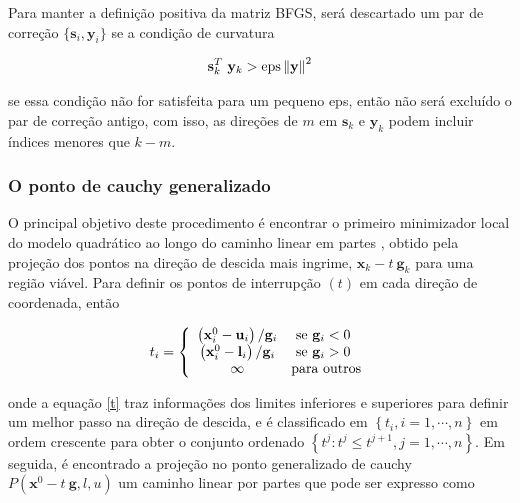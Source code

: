           
          Para manter a definição positiva da matriz BFGS, será descartado um par de correção $\{\mathbf{s}_{i},\mathbf{y}_{i} \}$ se a condição de curvatura 
          
          \begin{eqnarray}
           \nonumber
           \mathbf{s}_{k}^{T}~\mathbf{y}_{k} > \hbox{eps} \left \| \mathbf{y} \right \|^{2}
          \end{eqnarray}
          
          se essa condição não for satisfeita para um pequeno eps, então não será excluído o par de correção antigo, com isso, as direções de $m$ em $\mathbf{s}_{k}$ e $\mathbf{y}_{k}$ podem incluir índices menores que $k-m$.

          \subsubsection{O ponto de cauchy generalizado}

          O principal objetivo deste procedimento é encontrar o primeiro minimizador local do modelo quadrático ao longo do caminho linear em partes \citep{lescrenier_convergence_1991}, obtido pela projeção dos pontos na direção de descida mais ingrime, $\mathbf{x}_{k}-t~\mathbf{g}_{k}$ para uma região viável. Para definir os pontos de interrupção $(t)$ em cada direção de coordenada, então
          
          \begin{eqnarray}
          \label{t}
          t_{i}=\left\{\begin{array}{cl}{\left(\mathbf{x}_{i}^{0}-\mathbf{u}_{i}\right) / \mathbf{g}_{i}} & {\hbox{ se } \mathbf{g}_{i}<0} \\ {\left(\mathbf{x}_{i}^{0}-\mathbf{l}_{i}\right) / \mathbf{g}_{i}} & {\hbox{ se } \mathbf{g}_{i}>0} \\ {\infty} & \hbox{para outros}\end{array}\right.
          \end{eqnarray}
          
          onde a equação \ref{t} traz informações dos limites inferiores e superiores para definir um melhor passo na direção de descida, e é classificado em $\left\{t_{i}, i=1,\cdots,n\right\}$ em ordem crescente para obter o conjunto ordenado $\left\{t^{j} : t^{j} \le t^{j+1}, j=1, \cdots, n\right \} $. Em seguida, é encontrado a projeção no ponto generalizado de cauchy $P(\mathbf{x}^{0} -t~\mathbf{g},l,u)$ um caminho linear por partes que pode ser expresso como
          
